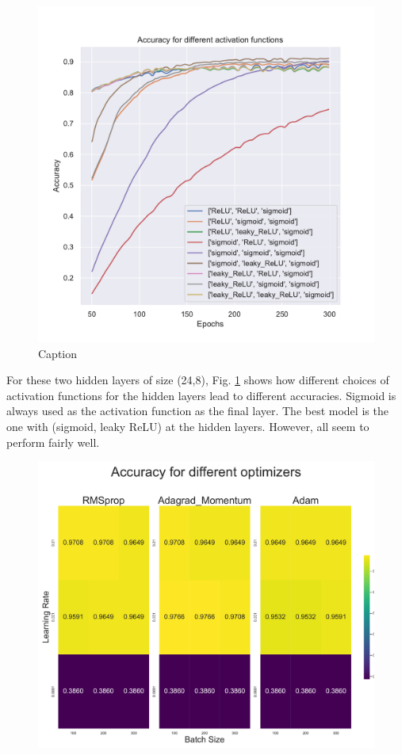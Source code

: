\begin{figure}[h!]
    \centering
    \includegraphics[width=1.0\linewidth]{project_2/figures/Accuracy for different activation functions_classification.pdf}
    \caption{Caption}
    \label{fig:activations_cancer}
\end{figure}

For these two hidden layers of size (24,8), Fig. \ref{fig:activations_cancer} shows how different choices of activation functions for the hidden layers lead to different accuracies. 
Sigmoid is always used as the activation function as the final layer. 
The best model is the one with (sigmoid, leaky ReLU) at the hidden layers. 
However, all seem to perform fairly well. 

\begin{figure}[h!]
    \centering
    \includegraphics[width=1.0\linewidth]{project_2/figures/Accuracy_grid_classification.pdf}
    \caption{}    
    \label{fig:grid_cancer}
\end{figure}

